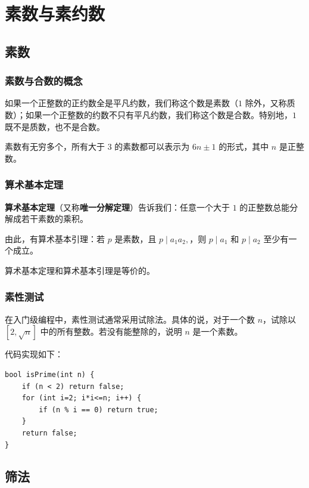 \chapter{素数与素约数}

\section{素数}

\subsection{素数与合数的概念}

如果一个正整数的正约数全是平凡约数，我们称这个数是素数（$1$ 除外，又称质数）；如果一个正整数的约数不只有平凡约数，我们称这个数是合数。特别地，$1$ 既不是质数，也不是合数。

素数有无穷多个，所有大于 $3$ 的素数都可以表示为 $6n \pm 1$ 的形式，其中 $n$ 是正整数。

\subsection{算术基本定理}

\textbf{算术基本定理}（又称\textbf{唯一分解定理}）告诉我们：任意一个大于 $1$ 的正整数总能分解成若干素数的乘积。

由此，有算术基本引理：若 $p$ 是素数，且 $p \mid a_1a_2,$，则 $p \mid a_1$ 和 $p \mid a_2$ 至少有一个成立。

算术基本定理和算术基本引理是等价的。

\subsection{素性测试}

在入门级编程中，素性测试通常采用试除法。具体的说，对于一个数 $n$，试除以 $[2, \sqrt{n}]$ 中的所有整数。若没有能整除的，说明 $n$ 是一个素数。

代码实现如下：

\begin{lstlisting}[caption=素性测试]
bool isPrime(int n) {
    if (n < 2) return false;
    for (int i=2; i*i<=n; i++) {
        if (n % i == 0) return true;
    }
    return false;
}
\end{lstlisting}

\section{筛法}

